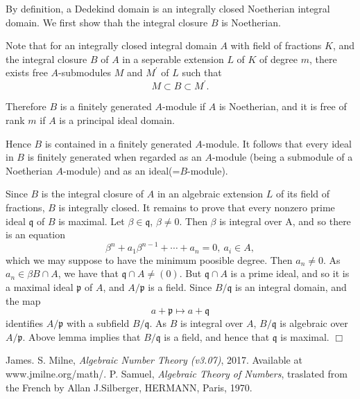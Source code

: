 \documentclass[11pt,a4paper,reqno]{amsart}
\numberwithin{equation}{section}
\newenvironment{pf}{{\noindent \bf Proof:\ }}{\hfill $\Box$ \bigskip}
\begin{document}
\begin{pf}
By definition, a Dedekind domain is an integrally closed Noetherian integral domain.
We first show thah the integral closure $B$ is Noetherian.

Note that for an integrally closed integral domain $A$ with field of fractions $K$,
and the integral closure $B$ of $A$ in a seperable extension $L$ of $K$ of degree $m$,
there exists free $A$-submodules $M$ and $M^\prime$ of $L$ such that
\[
M \subset B \subset {M^\prime}.
\]

Therefore $B$ is a finitely generated $A$-module if $A$ is Noetherian,
and it is free of rank $m$ if $A$ is a principal ideal domain.

Hence $B$ is contained in a finitely generated $A$-module.
It follows that every ideal in $B$ is finitely generated when regarded as an $A$-module
(being a submodule of a Noetherian $A$-module) and as an ideal(=$B$-module).

Since $B$ is the integral closure of $A$ in an algebraic extension $L$ of its field of fractions, $B$ is integrally closed.
It remains to prove that every nonzero prime ideal $\mathfrak{q}$ of $B$ is maximal.
Let $\beta \in \mathfrak{q}$, $\beta \neq 0$.
Then $\beta$ is integral over A,
and so there is an equation
\[
\beta^n + a_1 \beta^{n-1} + \cdots + a_n = 0,~a_i \in A,
\]
which we may suppose to have the minimum poosible degree.
Then $a_n \neq 0$.
As $a_n \in \beta B \cap A$,
we have that $\mathfrak{q} \cap A \neq (0)$.
But $\mathfrak{q} \cap A$ is a prime ideal, and so it is a maximal ideal $\mathfrak{p}$ of $A$, and $A/\mathfrak{p}$ is a field.
Since $B/\mathfrak{q}$ is an integral domain, and the map
\[
a+\mathfrak{p} \mapsto a+ \mathfrak{q}
\]
identifies $A/\mathfrak{p}$ with a subfield $B/\mathfrak{q}$.
As $B$ is integral over $A$, $B/\mathfrak{q}$ is algebraic over $A/\mathfrak{p}$.
Above lemma implies that $B/\mathfrak{q}$ is a field, and hence that $\mathfrak{q}$ is maximal.
\end{pf}

\begin{thebibliography}{alpha} 
 James. S. Milne, \emph{Algebraic Number Theory (v3.07)}, 2017. Available at www.jmilne.org/math/. 
 P. Samuel, \emph{Algebraic Theory of Numbers}, traslated from the French by Allan J.Silberger, HERMANN, Paris, 1970. 
\end{thebibliography} 
\end{document}
